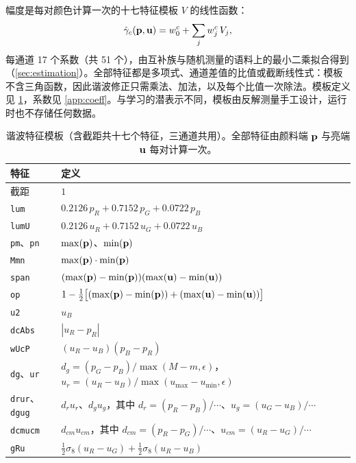 幅度是每对颜色计算一次的十七特征模板 $V$ 的线性函数：
\begin{equation}
\hat{\gamma}_{c}(\mathbf{p},\mathbf{u})=w_{0}^{c}+\sum_{j}w_{j}^{c}\,V_{j},
\label{eq:gamma}
\end{equation}
每通道 17 个系数（共 51 个），由互补族与随机测量的语料上的最小二乘拟合得到（\cref{sec:estimation}）。全部特征都是多项式、通道差值的比值或截断线性式：模板不含三角函数，因此谐波修正只需乘法、加法，以及每个比值一次除法。模板定义见 \cref{tab:features}，系数见 \cref{app:coeff}。与学习的潜表示不同，模板由反解测量手工设计，运行时也不存储任何数据。

\begin{table}[t]
\centering
\scriptsize
\setlength{\tabcolsep}{3pt}
\caption{谐波特征模板（含截距共十七个特征，三通道共用）。全部特征由颜料端 $\mathbf{p}$ 与亮端 $\mathbf{u}$ 每对计算一次。}
\label{tab:features}
\begin{tabular}{ll}
\toprule
特征 & 定义 \\
\midrule
截距 & $1$ \\
\texttt{lum} & $0.2126\,p_{R}+0.7152\,p_{G}+0.0722\,p_{B}$ \\
\texttt{lumU} & $0.2126\,u_{R}+0.7152\,u_{G}+0.0722\,u_{B}$ \\
\texttt{pm}、\texttt{pn} & $\max(\mathbf{p})$、$\min(\mathbf{p})$ \\
\texttt{Mmn} & $\max(\mathbf{p})\cdot\min(\mathbf{p})$ \\
\texttt{span} & $(\max(\mathbf{p})-\min(\mathbf{p}))(\max(\mathbf{u})-\min(\mathbf{u}))$ \\
\texttt{op} & $1-\tfrac12\bigl[(\max(\mathbf{p})-\min(\mathbf{p}))+(\max(\mathbf{u})-\min(\mathbf{u}))\bigr]$ \\
\texttt{u2} & $u_{B}$ \\
\texttt{dcAbs} & $|u_{R}-p_{R}|$ \\
\texttt{wUcP} & $(u_{R}-u_{B})(p_{B}-p_{R})$ \\
\texttt{dg}、\texttt{ur} & $d_{g}=(p_{G}-p_{B})/\max(M-m,\epsilon)$，$u_{r}=(u_{R}-u_{B})/\max(u_{\max}-u_{\min},\epsilon)$ \\
\texttt{drur}、\texttt{dgug} & $d_{r}u_{r}$、$d_{g}u_{g}$，其中 $d_{r}=(p_{R}-p_{B})/\cdots$、$u_{g}=(u_{G}-u_{B})/\cdots$ \\
\texttt{dcmucm} & $d_{cm}u_{cm}$，其中 $d_{cm}=(p_{R}-p_{G})/\cdots$、$u_{cm}=(u_{R}-u_{G})/\cdots$ \\
\texttt{gRu} & $\tfrac12\sigma_{8}(u_{R}-u_{G})+\tfrac12\sigma_{8}(u_{R}-u_{B})$ \\
\bottomrule
\end{tabular}
\end{table}

